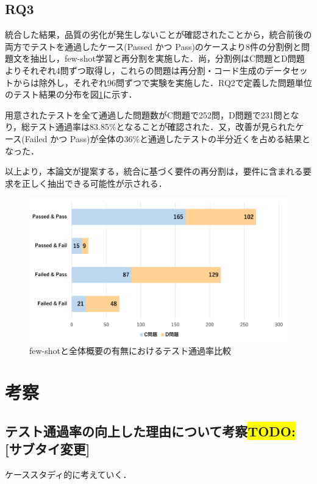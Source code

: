 \documentclass[submit,techrep,noauthor]{ipsj}
\newcommand{\todo}[1]{\colorbox{yellow}{{\bf TODO}:}{\color{red} {\textbf{[#1]}}}}
\begin{document}
\subsection{RQ3}
統合した結果，品質の劣化が発生しないことが確認されたことから，統合前後の両方でテストを通過したケース(Passed かつ Pass)のケースより8件の分割例と問題文を抽出し，few-shot学習と再分割を実施した．尚，分割例はC問題とD問題よりそれぞれ4問ずつ取得し，これらの問題は再分割・コード生成のデータセットからは除外し，それぞれ96問ずつで実験を実施した．RQ2で定義した問題単位のテスト結果の分布を図\ref{rq3_1}に示す．

用意されたテストを全て通過した問題数がC問題で252問，D問題で231問となり，総テスト通過率は83.85\%となることが確認された．又，改善が見られたケース(Failed かつ Pass)が全体の36\%と通過したテストの半分近くを占める結果となった．

以上より，本論文が提案する，統合に基づく要件の再分割は，要件に含まれる要求を正しく抽出できる可能性が示される．

\begin{figure}[t]
    \centering
    \includegraphics[width=1.0\linewidth]{./Toyoshima_fig/RQ3_1.pdf}
    \caption{few-shotと全体概要の有無におけるテスト通過率比較\protect\footnotemark}
    \label{rq3_1}
\end{figure}

\section{考察}
\label{sec:discussion}
\subsection{テスト通過率の向上した理由について考察\todo{サブタイ変更}}
ケーススタディ的に考えていく．
\end{document}
